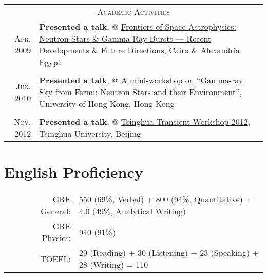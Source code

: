 \documentclass[10pt]{article}
\begin{document}
\vspace{-2.5em}

\begin{longtable}{r|p{16.5cm}}
\multicolumn{2}{c}{\textsc{Academic Activities}}  \\
\textsc{Apr. 2009}   &   \textbf{Presented a talk}, @ \href{http://www.ns-grb.com/index0.html}{Frontiers of Space Astrophysics: Neutron Stars \& Gamma Ray Bursts --- Recent Developments \& Future Directions}, Cairo \& Alexandria, Egypt     \\
\multicolumn{2}{c}{} \\
\textsc{Jun. 2010}   &   \textbf{Presented a talk}, @ \href{http://www.physics.hku.hk/~astro/2010Astro/Index.htm}{A mini-workshop on ``Gamma-ray Sky from Fermi: Neutron Stars and their Environment''}, University of Hong Kong, Hong Kong   \\
\multicolumn{2}{c}{} \\
\textsc{Nov. 2012}   &   \textbf{Presented a talk}, @ \href{http://www.thca.tsinghua.edu.cn/en/index.php/Workshop_programme}{Tsinghua Transient Workshop 2012}, Tsinghua University, Beijing   \\
\end{longtable}

\vspace{-1ex}
\section{English Proficiency}
\begin{tabular}{rl}
~~~~~GRE General:        & 550 (69\%, Verbal) + 800 (94\%, Quantitative) + 4.0 (49\%, Analytical Writing)    \\
~~~~~GRE Physics:        & 940 (91\%)    \\
~~~~~TOEFL:      &   29 (Reading) + 30 (Listening) + 23 (Speaking) + 28 (Writing) = 110
\end{tabular}
\end{document}
